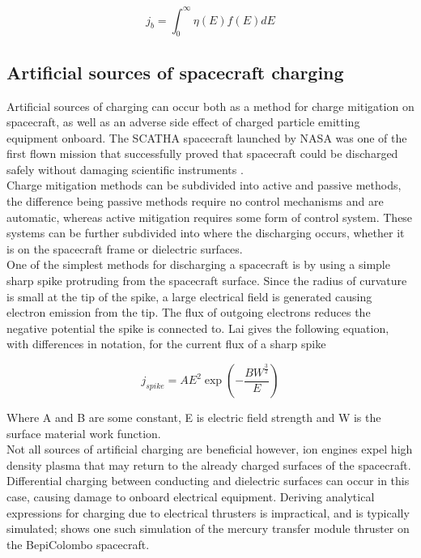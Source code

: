 \begin{equation}\label{eq:backscatterE}
    j_b = \int^{\infty}_0 \eta(E) f(E) dE
\end{equation}

\subsection*{Artificial sources of spacecraft charging}
Artificial sources of charging can occur both as a method for charge mitigation on spacecraft, as well as an adverse side effect of charged particle emitting equipment onboard. The SCATHA spacecraft launched by NASA was one of the first flown mission that successfully proved that spacecraft could be discharged safely without damaging scientific instruments . 
\\
Charge mitigation methods can be subdivided into active and passive methods, the difference being passive methods require no control mechanisms and are automatic, whereas active mitigation requires some form of control system. These systems can be further subdivided into where the discharging occurs, whether it is on the spacecraft frame or dielectric surfaces.
\\
One of the simplest methods for discharging a spacecraft is by using a simple sharp spike protruding from the spacecraft surface. Since the radius of curvature is small at the tip of the spike, a large electrical field is generated causing electron emission from the tip. The flux of outgoing electrons reduces the negative potential the spike is connected to. Lai  gives the following equation, with differences in notation, for the current flux of a sharp spike 

\begin{equation}
    j_{spike} = A E^2 \exp \left(- \frac{B W^{\frac{3}{2}}}{E} \right)
\end{equation}

Where A and B are some constant, E is electric field strength and W is the surface material work function.
\\
Not all sources of artificial charging are beneficial however, ion engines expel high density plasma that may return to the already charged surfaces of the spacecraft. Differential charging between conducting and dielectric surfaces can occur in this case, causing damage to onboard electrical equipment. Deriving analytical expressions for charging due to electrical thrusters is impractical, and is typically simulated;  shows one such simulation of the mercury transfer module thruster on the BepiColombo spacecraft. 



\newpage